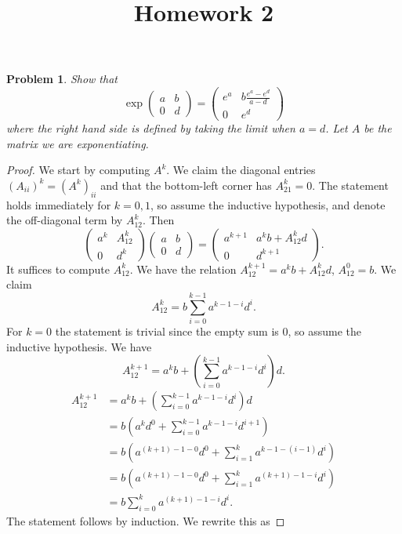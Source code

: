 \documentclass[11pt, letterpaper]{article}
\title{Homework 2}
\theoremstyle{plain}
\newtheorem{problem}{Problem}
\begin{document}
\makeproblem

\begin{problem}
	Show that
	\[
		\exp \begin{pmatrix}
		a & b \\
		0 & d
		\end{pmatrix}=\begin{pmatrix}
		e^a & b\frac{e^a-e^d}{a-d}  \\
		0 & e^d
		\end{pmatrix}
	\]
	where the right hand side is defined by taking the limit when $a=d$. Let $A$ be the matrix we are exponentiating.
\end{problem}
\begin{proof}
 We start by computing $A^k$. We claim the diagonal entries $(A_{ii})^k=(A^k)_{ii}  $ and that the bottom-left corner has $A_{21} ^k=0$. The statement holds immediately for $k=0,1$, so assume the inductive hypothesis, and denote the off-diagonal term by $A_{12}^k $. Then
	\[
		\begin{pmatrix}
		a^k & A_{12} ^k \\
		0 & d^k
		\end{pmatrix}\begin{pmatrix}
		a & b \\
		0 & d
		\end{pmatrix}=\begin{pmatrix}
		a^{k+1}  & a^kb + A^k_{12} d \\
		0 & d^{k+1} 
		\end{pmatrix}
	.\]
	It suffices to compute  $A_{12} ^k$. We have the relation $A^{k+1}_{12} =a^kb + A_{12} ^kd$, $A^0_{12} =b$. We claim
	\[
		A_{12} ^k=b \sum_{i=0}^{k-1} a^{k-1-i} d^i
	.\]
	For $k=0$ the statement is trivial since the empty sum is 0, so assume the inductive hypothesis. We have
	\[
		A_{12} ^{k+1} =a^kb + \left( \sum_{i=0}^{k-1} a^{k-1-i} d^i \right) d
	.\]
	\begin{align*}
		A_{12} ^{k+1} &=a^kb + \left( \sum_{i=0}^{k-1} a^{k-1-i} d^i \right) d\\
			      &=b\left( a^kd^0 + \sum_{i=0}^{k-1} a^{k-1-i} d^{i+1}  \right) \\
			      &=b\left( a^{(k+1)-1-0} d^0 + \sum_{i=1}^{k} a^{k-1-(i-1)} d^i \right) \\
			      &=b\left( a^{(k+1)-1-0} d^0 + \sum_{i=1}^{k} a^{(k+1)-1-i} d^i \right) \\
			      &=b \sum_{i=0}^{k} a^{(k+1)-1-i} d^i
	.\end{align*}
	The statement follows by induction. We rewrite this as

\end{proof}
\end{document}

